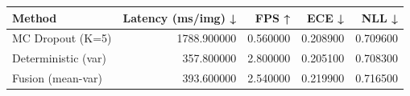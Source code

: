 \begin{tabular}{lrrrr}
\toprule
Method & Latency (ms/img) ↓ & FPS ↑ & ECE ↓ & NLL ↓ \\
\midrule
MC Dropout (K=5) & 1788.900000 & 0.560000 & 0.208900 & 0.709600 \\
Deterministic (var) & 357.800000 & 2.800000 & 0.205100 & 0.708300 \\
Fusion (mean-var) & 393.600000 & 2.540000 & 0.219900 & 0.716500 \\
\bottomrule
\end{tabular}

